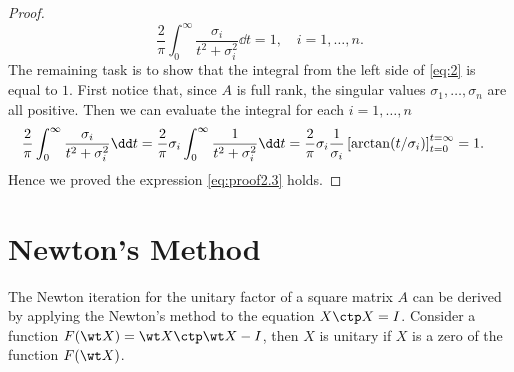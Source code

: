 \documentclass{article}
\numberwithin{equation}{section} %
\begin{document}
\begin{proof}
\begin{equation}
  \label{eq:2}
  \frac{2}{\pi}\int_0^\infty \frac{\sigma_i}{t^2 + \sigma_i^2} \dd t = 1,\quad \text{$i = 1,\dots,n$.}
\end{equation}
The remaining task is to show that the integral from the left side of
\eqref{eq:2} is equal to $1$. First notice that, since $A$ is full rank,
the singular values $\sigma_1, \dots, \sigma_n$ are all positive. Then we
can evaluate the integral for each $i = 1,\dots,n$
\begin{equation}
  \notag 
  \begin{aligned}
    \frac{2}{\pi}\int_0^\infty \frac{\sigma_i}{t^2 + \sigma_i^2} \dd t & = \frac{2}{\pi} \sigma_i \int_0^\infty \frac{1}{t^2  + \sigma_i^2}\dd t = \frac{2}{\pi}\sigma_i \frac{1}{\sigma_i} \left[\arctan(t/\sigma_i)\right]_{t = 0}^{t = \infty} = 1. 
  \end{aligned}
\end{equation}
Hence we proved the expression \eqref{eq:proof2.3} holds.
\end{proof}

\section{Newton's Method}

The Newton iteration for the unitary factor of a square matrix $A$ can be
derived by applying the Newton's method to the equation $X\ctp X = I$.
Consider a function $F(\wt X) = \wt X\ctp \wt X - I$, then $X$ is unitary
if $X$ is a zero of the function $F(\wt X)$.
\end{document}
